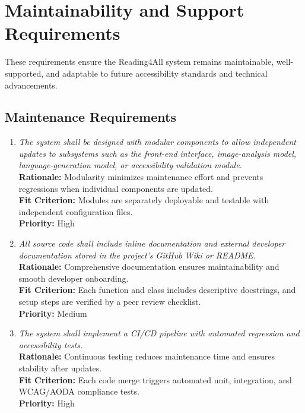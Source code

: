 \documentclass[12pt]{article}
\begin{document}
\section{Maintainability and Support Requirements}

These requirements ensure the Reading4All system remains maintainable, well-supported, and adaptable to future accessibility standards and technical advancements.

\subsection{Maintenance Requirements}

\begin{enumerate}[label=MS-MNT\arabic*., wide=0pt, leftmargin=*]
  \item \emph{The system shall be designed with modular components to allow independent updates to subsystems such as the front-end interface, image-analysis model, language-generation model, or accessibility validation module.}\\[2mm]
    {\bf Rationale:} Modularity minimizes maintenance effort and prevents regressions when individual components are updated.\\
    {\bf Fit Criterion:} Modules are separately deployable and testable with independent configuration files.\\
    {\bf Priority:} High

  \item \emph{All source code shall include inline documentation and external developer documentation stored in the project’s GitHub Wiki or README.}\\[2mm]
    {\bf Rationale:} Comprehensive documentation ensures maintainability and smooth developer onboarding.\\
    {\bf Fit Criterion:} Each function and class includes descriptive docstrings, and setup steps are verified by a peer review checklist.\\
    {\bf Priority:} Medium

  \item \emph{The system shall implement a CI/CD pipeline with automated regression and accessibility tests.}\\[2mm]
    {\bf Rationale:} Continuous testing reduces maintenance time and ensures stability after updates.\\
    {\bf Fit Criterion:} Each code merge triggers automated unit, integration, and WCAG/AODA compliance tests.\\
    {\bf Priority:} High
\end{enumerate}
\end{document}
